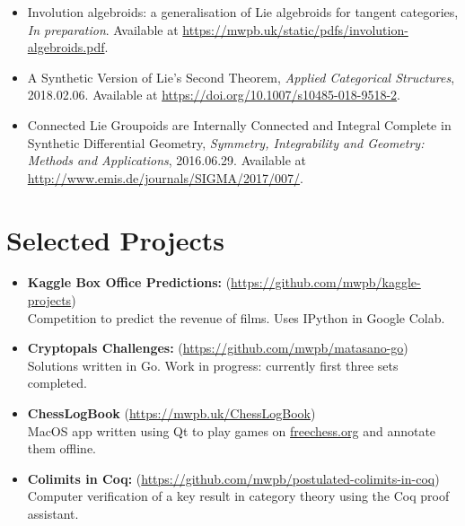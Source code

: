 \documentclass[a4paper,10pt]{article}
\begin{document}
\begin{itemize}
    \item Involution algebroids: a generalisation of Lie algebroids for tangent categories, \emph{In preparation}. Available at \url{https://mwpb.uk/static/pdfs/involution-algebroids.pdf}.
    \item A Synthetic Version of Lie's Second Theorem, \emph{Applied Categorical Structures}, 2018.02.06. Available at \url{https://doi.org/10.1007/s10485-018-9518-2}.
    \item Connected Lie Groupoids are Internally Connected and Integral Complete in Synthetic Differential Geometry, \emph{Symmetry, Integrability and Geometry: Methods and Applications}, 2016.06.29. Available at \url{http://www.emis.de/journals/SIGMA/2017/007/}.
\end{itemize}

\section{Selected Projects}

\begin{itemize}
  \item \textbf{Kaggle Box Office Predictions:} (\url{https://github.com/mwpb/kaggle-projects})\\
  Competition to predict the revenue of films. 
  Uses IPython in Google Colab.
  \item \textbf{Cryptopals Challenges:} (\url{https://github.com/mwpb/matasano-go})\\
  Solutions written in Go. Work in progress: currently first three sets completed.
	\item \textbf{ChessLogBook} (\url{https://mwpb.uk/ChessLogBook})\\
  MacOS app written using Qt to play games on \url{freechess.org} and annotate them offline.
	\item \textbf{Colimits in Coq:} (\url{https://github.com/mwpb/postulated-colimits-in-coq})\\
  Computer verification of a key result in category theory using the Coq proof assistant.
\end{itemize}

\end{document}
